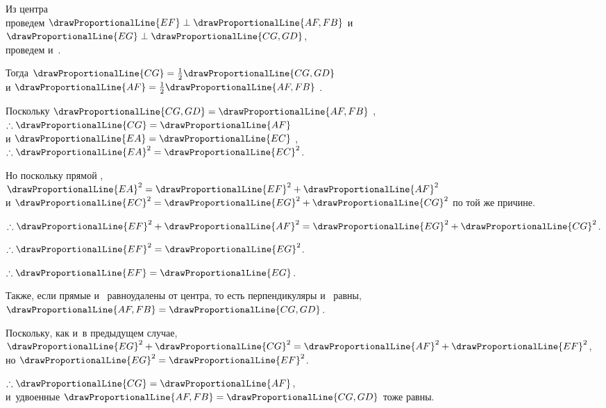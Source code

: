 \documentclass[letters,booklanguage=russian]{byrnebook}
\begin{document}
\begin{center}
Из центра \\
проведем $\drawProportionalLine{EF} \perp \drawProportionalLine{AF,FB}$ и~$\drawProportionalLine{EG} \perp \drawProportionalLine{CG,GD}$,\\
проведем  и~.

Тогда $\drawProportionalLine{CG} = \frac{1}{2} \drawProportionalLine{CG,GD}$ \\
и $\drawProportionalLine{AF} = \frac{1}{2} \drawProportionalLine{AF,FB}$ .

Поскольку $\drawProportionalLine{CG,GD} = \drawProportionalLine{AF,FB}$ \byref{\hypref},\\
$\therefore \drawProportionalLine{CG} = \drawProportionalLine{AF}$ \\
и $\drawProportionalLine{EA} = \drawProportionalLine{EC}$ ,\\
$\therefore \drawProportionalLine{EA}^2 = \drawProportionalLine{EC}^2$.

Но поскольку  прямой \byref{\constref},\\
$\drawProportionalLine{EA}^2 = \drawProportionalLine{EF}^2 + \drawProportionalLine{AF}^2$ \\
и $\drawProportionalLine{EC}^2 = \drawProportionalLine{EG}^2 + \drawProportionalLine{CG}^2$ по той же причине.

$\therefore \drawProportionalLine{EF}^2 + \drawProportionalLine{AF}^2 = \drawProportionalLine{EG}^2 + \drawProportionalLine{CG}^2$.

$\therefore \drawProportionalLine{EF}^2 = \drawProportionalLine{EG}^2$.

$\therefore \drawProportionalLine{EF} = \drawProportionalLine{EG}$.
\end{center}

Также, если прямые  и~ равноудалены от центра, то есть перпендикуляры  и~ равны, $\drawProportionalLine{AF,FB} = \drawProportionalLine{CG,GD}$.

\begin{center}
Поскольку, как и~в предыдущем случае,\\
$\drawProportionalLine{EG}^2 + \drawProportionalLine{CG}^2 = \drawProportionalLine{AF}^2 + \drawProportionalLine{EF}^2$,\\
но $\drawProportionalLine{EG}^2 = \drawProportionalLine{EF}^2$.

$\therefore \drawProportionalLine{CG} = \drawProportionalLine{AF}$,\\
и~удвоенные $\drawProportionalLine{AF,FB} = \drawProportionalLine{CG,GD}$ тоже равны.
\end{center}
\end{document}
